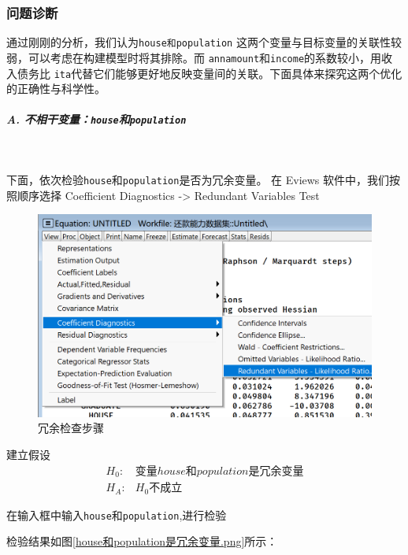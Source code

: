 \documentclass[13.5pt,hyperref,a4paper,UTF8]{ctexart}
\begin{document}
\subsubsection{问题诊断}
通过刚刚的分析，我们认为\texttt{house和population} 这两个变量与目标变量的关联性较弱，可以考虑在构建模型时将其排除。而 \texttt{annamount}和\texttt{income}的系数较小，用收入债务比 \texttt{ita}代替它们能够更好地反映变量间的关联。下面具体来探究这两个优化的正确性与科学性。

\subparagraph {A. 不相干变量：\texttt{house}和\texttt{population}} 
\

下面，依次检验\texttt{house}和\texttt{population}是否为冗余变量。
在 Eviews 软件中，我们按照顺序选择 Coefficient Diagnostics -> Redundant Variables Test

\begin{figure}[H]
    \centering
    \includegraphics[width=0.5\linewidth]{figures//3回归//回归1/冗余检查步骤.png}
    \caption{冗余检查步骤}
    \label{冗余检查步骤模型1}
\end{figure}
建立假设
\begin{equation}
    \begin{split}
        H_0:& 变量house和population是冗余变量 \\
        H_A:& H_0不成立 \nonumber
    \end{split}
\end{equation}

在输入框中输入\texttt{house}和\texttt{population},进行检验

检验结果如图\ref{house和population是冗余变量.png}所示：
\end{document}
